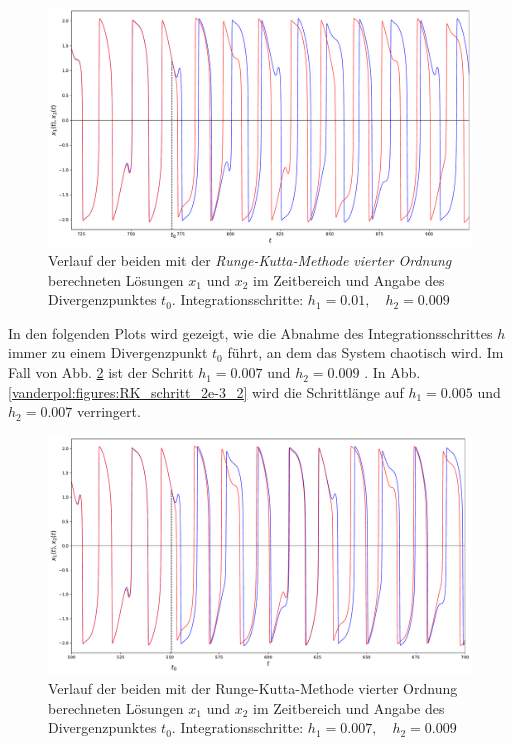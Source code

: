 \begin{figure}
\includegraphics[width=\textwidth]{papers/vanderpol/figures/RK_schritt_delta_e-3.pdf}
\caption{Verlauf der beiden mit der {\em Runge-Kutta-Methode vierter Ordnung} berechneten Lösungen $x_1$ und $x_2$ im Zeitbereich und Angabe des Divergenzpunktes $t_0$. Integrationsschritte: $h_1 = 0.01, \quad h_2 = 0.009$\label{vanderpol:figures:RK_schritt_e-3}}
\end{figure}
In den folgenden Plots wird gezeigt, wie die Abnahme des Integrationsschrittes $h$ immer zu einem Divergenzpunkt $t_0$ führt, an dem das System chaotisch wird. Im Fall von Abb. \ref{vanderpol:figures:RK_schritt_2e-3} ist der Schritt $h_1=0.007$ und $h_2=0.009$ . In Abb. \ref{vanderpol:figures:RK_schritt_2e-3_2} wird die Schrittlänge auf $h_1=0.005$ und $h_2=0.007$ verringert.

\begin{figure}
\includegraphics[width=\textwidth]{papers/vanderpol/figures/RK_schritt_delta_2e-3_2.pdf}
\caption{Verlauf der beiden mit der Runge-Kutta-Methode vierter Ordnung berechneten Lösungen $x_1$ und $x_2$ im Zeitbereich und Angabe des Divergenzpunktes $t_0$. Integrationsschritte: $h_1 = 0.007, \quad h_2 = 0.009$\label{vanderpol:figures:RK_schritt_2e-3}}
\end{figure}

